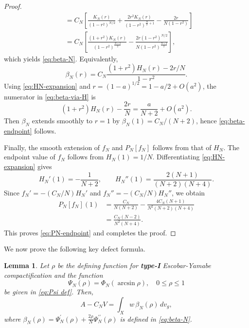 \documentclass[11pt,letterpaper]{amsart}
\newtheorem{lemma}[theorem]{Lemma}
\theoremstyle{definition}
\theoremstyle{remark}
\numberwithin{equation}{section}
\begin{document}
\begin{proof}
\begin{equation}
\begin{aligned}
& =C_N\left[\frac{K_N(r)}{\left(1-r^2\right)^{N / 2}}+\frac{2 r^2 K_N(r)}{\left(1-r^2\right)^{\frac{N}{2}+1}}-\frac{2 r}{N\left(1-r^2\right)}\right] \\
& =C_N\left[\frac{\left(1+r^2\right) K_N(r)}{\left(1-r^2\right)^{\frac{N+2}{2}}}-\frac{2 r\left(1-r^2\right)^{N / 2}}{N\left(1-r^2\right)^{\frac{N+2}{2}}}\right],
\end{aligned}
\end{equation}
which yields \eqref{eq:beta-N}.
Equivalently,
\begin{equation}\label{eq:beta-via-H}
 \beta_N(r)=C_N\frac{(1+r^2)H_N(r)-2r/N}{1-r^2}.
\end{equation}
Using \eqref{eq:HN-expansion} and $r=(1-a)^{1/2}=1-a/2+O(a^2)$, the numerator in \eqref{eq:beta-via-H} is 
\[\left(1+r^2\right) H_N(r)-\frac{2 r}{N}=\frac{a}{N+2}+O\left(a^2\right) .\]
Then $\beta_N$ extends smoothly to $r=1$ by $\beta_N(1)=C_N /(N+2)$, hence \eqref{eq:beta-endpoint} follows. 

Finally, the smooth extension of $f_N$ and $P_N[f_N]$ follows from that of $H_N$. The endpoint value of $f_N$ follows from $H_N(1)=1/N$.  Differentiating \eqref{eq:HN-expansion} gives
\[
 H_N'(1)=-\frac1{N+2},\qquad
 H_N''(1)=\frac{2(N+1)}{(N+2)(N+4)}.
\]
Since $f_N'=-(C_N/N)H_N'$ and $f_N''=-(C_N/N)H_N''$, we obtain
\[\begin{aligned} P_N[f_N](1) & =\frac{C_N}{N(N+2)}-\frac{4 C_N(N+1)}{N^2(N+2)(N+4)} \\ & =\frac{C_N(N-2)}{N^2(N+4)}.\end{aligned}\]
This proves \eqref{eq:PN-endpoint} and completes the proof.
\end{proof}
We now prove the following key defect formula.
\begin{lemma}\label{key defect lemma}
Let $\rho$ be the defining function for \textbf{type-I} Escobar-Yamabe compactification and the function
\[
 \Psi_N(\rho)=\Phi_N(\arcsin \rho),\quad 0\le \rho\le1
\] 
be given in \eqref{eq:Psi def}. Then,
\begin{equation}\label{eq:defect-D}
 A-C_NV=\int_Xw\,\beta_N(\rho)\,dv_g,
\end{equation}
where $\beta_N(\rho)=\Psi_N^{\prime}(\rho)+\frac{2 \rho}{N} \Psi_N^{\prime \prime}(\rho)$ is defined in \eqref{eq:beta-N}.
\end{lemma}
\end{document}
